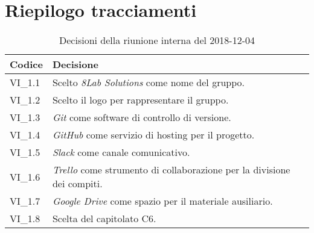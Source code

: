 \section{Riepilogo tracciamenti}

	
	\begin{longtable}{ >{\centering}p{} >{}p{}}
		\caption{Decisioni della riunione interna del 2018-12-04}\\	
		\rowcolorhead
		\textbf{\color{white}Codice} 
		& \centering\textbf{\color{white}Decisione} 
		\tabularnewline 
		\endfirsthead
		VI\_1.1 & Scelto \textit{8Lab Solutions} come nome del gruppo.
		
		\tabularnewline 
		VI\_1.2 & Scelto il logo per rappresentare il gruppo.
		
		\tabularnewline 
		VI\_1.3 & \textit{Git} come software di controllo di versione.
	
		\tabularnewline 
		VI\_1.4 & \textit{GitHub} come servizio di hosting per il progetto.
		
		\tabularnewline 
		VI\_1.5 & \textit{Slack} come canale comunicativo.
		
		\tabularnewline 
		VI\_1.6 & \textit{Trello} come strumento di collaborazione per la divisione 
				dei compiti.
	
		\tabularnewline 
		VI\_1.7 & \textit{Google Drive} come spazio per il materiale ausiliario.
		
		\tabularnewline
		VI\_1.8 & Scelta del capitolato C6.	
	
	\end{longtable}
	




